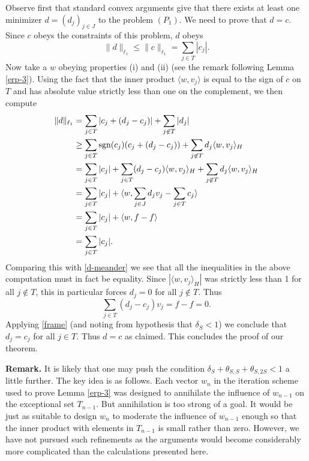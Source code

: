 \documentclass[11pt]{article}
\def\sgn{{\hbox{sgn}}}
\newcommand{\<}{\langle}
\renewcommand{\>}{\rangle}
\numberwithin{equation}{section}
\begin{document}
Observe first that standard convex arguments give that there exists at
least one minimizer $d = (d_j)_{j \in J}$ to the problem $(P_1)$.  We
need to prove that $d = c$.  Since $c$ obeys the constraints of this
problem, $d$ obeys
\begin{equation}\label{d-meander}
 \| d \|_{\ell_1} \leq 
\|c\|_{\ell_1} = \sum_{j \in T} |c_j|.
 \end{equation}
 Now take a $w$ obeying properties (i) and (ii) (see the remark
 following Lemma \ref{erp-3}).  Using the fact that the inner product
 $\langle w, v_j\rangle$ is equal to the sign of $c$ on $T$ and has
 absolute value strictly less than one on the complement, we then
 compute
\begin{align*}
  \| d \|_{\ell_1} &= 
\sum_{j \in T} |c_j + (d_j-c_j)| + \sum_{j \not \in T} |d_j| \\
  &\geq \sum_{j \in T} \sgn(c_j) (c_j + (d_j-c_j)) + 
\sum_{j \not \in T} d_j \langle w, v_j \rangle_H \\
  &= \sum_{j \in T} |c_j| + \sum_{j \in T} (d_j - c_j) 
\langle w, v_j \rangle_H + \sum_{j \not \in T} d_j \langle w, v_j \rangle_H  \\
  &= \sum_{j \in T} |c_j| + 
\langle w, \sum_{j \in J} d_j v_j - \sum_{j \in T} c_j \rangle \\
  &= \sum_{j \in T} |c_j| + \langle w, f - f \rangle \\
  &= \sum_{j \in T} |c_j|.
\end{align*}
Comparing this with \eqref{d-meander} we see that all the inequalities
in the above computation must in fact be equality.  Since $|\langle w,
v_j \rangle_H|$ was strictly less than 1 for all $j \not \in T$, this
in particular forces $d_j = 0$ for all $j \notin T$.  Thus
$$
\sum_{j \in T} (d_j - c_j) v_j = f - f = 0.$$
Applying
\eqref{frame} (and noting from hypothesis that $\delta_S < 1$) we
conclude that $d_j = c_j$ for all $j \in T$.  Thus $d = c$ as claimed.
This concludes the proof of our theorem.

{\bf Remark.}  It is likely that one may push the condition $\delta_S
+ \theta_{S,S} + \theta_{S,2S} < 1$ a little further.  The key idea is
as follows. Each vector $w_n$ in the iteration scheme used to prove
Lemma \ref{erp-3} was designed to annihilate the influence of
$w_{n-1}$ on the exceptional set $T_{n-1}$.  But annihilation is too
strong of a goal.  It would be just as suitable to design $w_n$ to
moderate the influence of $w_{n-1}$ enough so that the inner product
with elements in $T_{n-1}$ is small rather than zero. However, we have 
not pursued such refinements as the arguments would become considerably 
more complicated than the calculations presented here.
\end{document}
